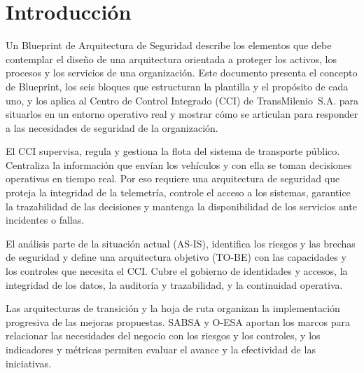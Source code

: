 \section*{Introducción}

Un Blueprint de Arquitectura de Seguridad describe los elementos que debe contemplar el diseño de
una arquitectura orientada a proteger los activos, los procesos y los servicios de una organización.
Este documento presenta el concepto de Blueprint, los seis bloques que estructuran la plantilla y el
propósito de cada uno, y los aplica al Centro de Control Integrado (CCI) de TransMilenio~S.A. para
situarlos en un entorno operativo real y mostrar cómo se articulan para responder a las necesidades de
seguridad de la organización.

El CCI supervisa, regula y gestiona la flota del sistema de transporte público. Centraliza la
información que envían los vehículos y con ella se toman decisiones operativas en tiempo real. Por
eso requiere una arquitectura de seguridad que proteja la integridad de la telemetría, controle el
acceso a los sistemas, garantice la trazabilidad de las decisiones y mantenga la disponibilidad de
los servicios ante incidentes o fallas.

El análisis parte de la situación actual (AS-IS), identifica los riesgos y las brechas de seguridad
y define una arquitectura objetivo (TO-BE) con las capacidades y los controles que necesita el CCI.
Cubre el gobierno de identidades y accesos, la integridad de los datos, la auditoría y trazabilidad,
y la continuidad operativa.

Las arquitecturas de transición y la hoja de ruta organizan la implementación progresiva de las
mejoras propuestas. SABSA y O-ESA aportan los marcos para relacionar las necesidades del negocio con
los riesgos y los controles, y los indicadores y métricas permiten evaluar el avance y la efectividad
de las iniciativas.
